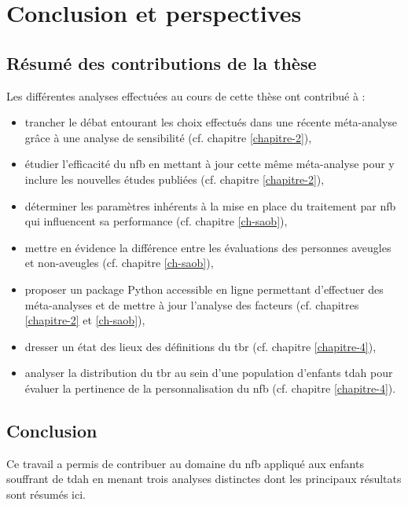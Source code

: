 \chapter{Conclusion et perspectives} \label{chapitre-5}

\section{Résumé des contributions de la thèse}

Les différentes analyses effectuées au cours de cette thèse ont contribué à :
\begin{itemize}
\item trancher le débat entourant les choix effectués dans une récente méta-analyse grâce à une analyse de sensibilité \citep{Cortese2016, Micoulaud2016} (cf. chapitre \ref{chapitre-2}),
\item étudier l'efficacité du \gls{nfb} en mettant à jour cette même méta-analyse pour y inclure les nouvelles études publiées \citep{Cortese2016} (cf. chapitre \ref{chapitre-2}),
\item déterminer les paramètres inhérents à la mise en place du traitement par \gls{nfb} qui influencent sa performance (cf. chapitre \ref{ch-saob}),
\item mettre en évidence la différence entre les évaluations des personnes aveugles et non-aveugles (cf. chapitre \ref{ch-saob}),
\item proposer un package Python accessible en ligne permettant d'effectuer des méta-analyses et de mettre à jour l'analyse des facteurs \citep{Bussalb2019c} (cf. chapitres \ref{chapitre-2} 
et \ref{ch-saob}),
\item dresser un état des lieux des définitions du \gls{tbr} (cf. chapitre \ref{chapitre-4}),
\item analyser la distribution du \gls{tbr} au sein d'une population d'enfants \gls{tdah} pour évaluer la pertinence 
de la personnalisation du \gls{nfb} (cf. chapitre \ref{chapitre-4}).
\end{itemize}

\section{Conclusion}

Ce travail a permis de contribuer au domaine du \gls{nfb} appliqué aux enfants souffrant de \gls{tdah} en menant trois analyses 
distinctes dont les principaux résultats sont résumés ici. 

